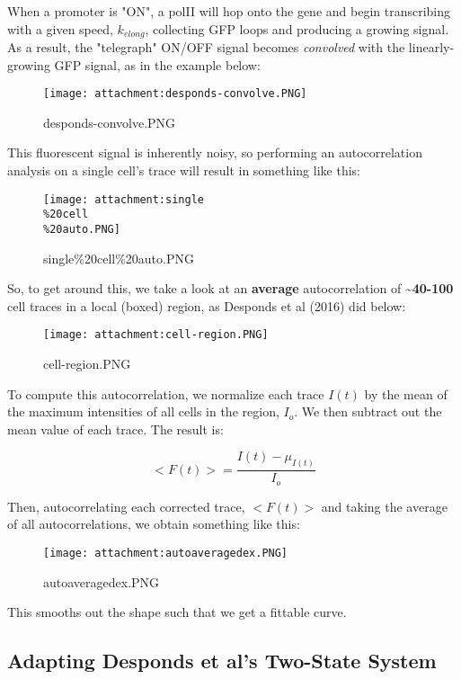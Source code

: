 \documentclass[11pt]{article}
\makeatletter
\def\maxwidth{\ifdim\Gin@nat@width>\linewidth\linewidth
    \else\Gin@nat@width\fi}
\let\Oldincludegraphics\includegraphics
\renewcommand{\includegraphics}[1]{\Oldincludegraphics[width=.8\maxwidth]{#1}}
\makeatother
\begin{document}
When a promoter is "ON", a polII will hop onto the gene and begin
transcribing with a given speed, \(k_{elong}\), collecting GFP loops and
producing a growing signal. As a result, the "telegraph" ON/OFF signal
becomes \emph{convolved} with the linearly-growing GFP signal, as in the
example below:

\begin{figure}
\centering
\texttt{[image: attachment:desponds-convolve.PNG]}
\caption{desponds-convolve.PNG}
\end{figure}

This fluorescent signal is inherently noisy, so performing an
autocorrelation analysis on a single cell's trace will result in
something like this:

\begin{figure}
\centering
\texttt{[image: attachment:single\\\%20cell\\\%20auto.PNG]}
\caption{single\%20cell\%20auto.PNG}
\end{figure}

So, to get around this, we take a look at an \textbf{average}
autocorrelation of \textbf{\textasciitilde{}40-100} cell traces in a
local (boxed) region, as Desponds et al (2016) did below:

\begin{figure}
\centering
\texttt{[image: attachment:cell-region.PNG]}
\caption{cell-region.PNG}
\end{figure}

To compute this autocorrelation, we normalize each trace \(I(t)\) by the
mean of the maximum intensities of all cells in the region, \(I_o\). We
then subtract out the mean value of each trace. The result is:

\[ <F(t)> = \frac{I(t) - \mu_{I(t)}}{I_o} \]

Then, autocorrelating each corrected trace, \(<F(t)>\) and taking the
average of all autocorrelations, we obtain something like this:

\begin{figure}
\centering
\texttt{[image: attachment:autoaveragedex.PNG]}
\caption{autoaveragedex.PNG}
\end{figure}

This smooths out the shape such that we get a fittable curve.

    \subsection{Adapting Desponds et al's Two-State
System}\label{adapting-desponds-et-als-two-state-system}
\end{document}
